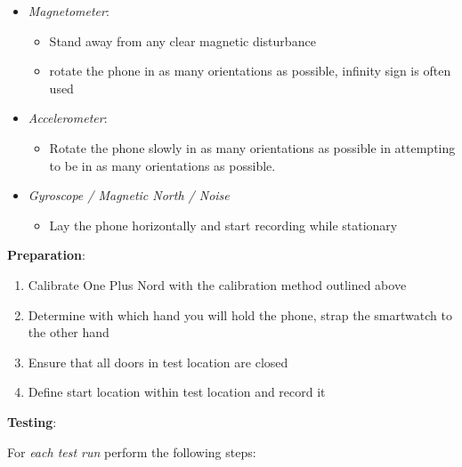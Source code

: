 \begin{itemize}
	\item
	\emph{Magnetometer}:
	
	\begin{itemize}
		\tightlist
		\item
		Stand away from any clear magnetic disturbance 
		\item
		rotate the phone in as many orientations as possible, infinity sign
		is often used
	\end{itemize}
	\item
	\emph{Accelerometer}:
	
	\begin{itemize}
		\tightlist
		\item
		Rotate the phone slowly in as many orientations as possible in
		attempting to be in as many orientations as possible.
	\end{itemize}
	\item
	\emph{Gyroscope / Magnetic North / Noise}
	
	\begin{itemize}
		\item
		Lay the phone horizontally and start recording while stationary
	\end{itemize}
\end{itemize}

\textbf{Preparation}:

\begin{enumerate}
	\def\labelenumi{\arabic{enumi}.}
	\tightlist
	\item
	Calibrate One Plus Nord with the calibration method outlined above
	\item
	Determine with which hand you will hold the phone, strap the
	smartwatch to the other hand
	\item
	Ensure that all doors in test location are closed
	\item
	Define start location within test location and record it
\end{enumerate}

\textbf{Testing}:

For \emph{each test run} perform the following steps:

